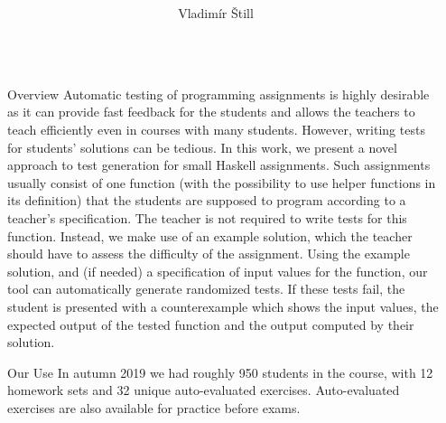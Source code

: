 \documentclass[final, 20pt, a0]{beamer}
\title{%
  \texorpdfstring{%
    \makebox[\linewidth]{%
      \noindent\hspace*{0.5em} %
      \hfill %
      \begin{minipage}{\linewidth-3em}\center\titletext\end{minipage} %
      \hfill %
      \hspace*{0.5em}%
    }\bigskip%
  }
  {\titletext}}
\author{Vladimír Štill}
\institute{Faculty of Informatics, Masaryk University\\Czech Republic\vspace*{-2cm}} %
\newlength{\marginwid}
\newlength{\onecolwid}
\begin{document}

\setlength{\belowcaptionskip}{2ex} %
\setlength\belowdisplayshortskip{2ex} %

\begin{frame}[t] %

\begin{columns}[t] %

\begin{column}{\marginwid}\end{column} %
\begin{column}{\onecolwid} %

\begin{block}{Overview}
    Automatic testing of programming assignments is highly desirable as it can
    provide fast feedback for the students and allows the teachers to teach
    efficiently even in courses with many students.
    However, writing tests for students' solutions can be tedious.
    In this work, we present a novel approach to test generation for small Haskell
    assignments.
    Such assignments usually consist of one function (with the possibility to use
    helper functions in its definition) that the students are supposed to program
    according to a teacher's specification.
    The teacher is not required to write tests for this function.
    Instead, we make use of an example solution, which the teacher should have
    to assess the difficulty of the assignment.
    Using the example solution, and (if needed) a specification of input values for
    the function, our tool can automatically generate randomized tests.
    If these tests fail, the student is presented with a counterexample which
    shows the input values, the expected output of the tested function and the
    output computed by their solution.
\end{block}

\begin{block}{Our Use}
    In autumn 2019 we had roughly 950 students in the course, with 12 homework
    sets and 32 unique auto-evaluated exercises.
    Auto-evaluated exercises are also available for practice before exams.
\end{block}


\end{column}
\end{columns}
\end{frame}
\end{document}
